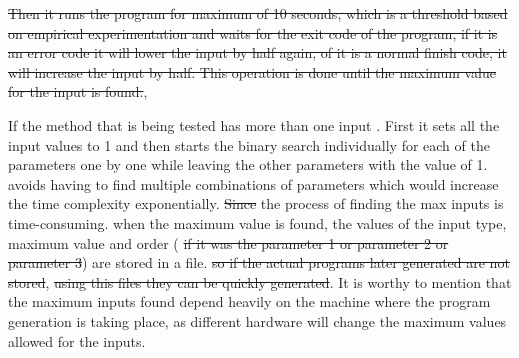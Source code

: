 \st{Then it runs the program for maximum of 10 seconds, which is a threshold based on empirical experimentation and waits for the exit code of the program, if it is an error code it will lower the input by half again, of it is a normal finish code, it will increase the input by half. This operation is done until the maximum value for the input is found.},

If the method that is being tested has more than one input . First it sets all the input values to 1 and then starts the binary search individually for each of the parameters one by one while leaving the other parameters with the value of 1.  avoids having to find multiple combinations of parameters which would increase the time complexity exponentially.  \st{Since} the process of finding the max inputs is time-consuming.  when the maximum value is found, the values of the input type, maximum value and order ( \st{if it was the parameter 1 or parameter 2 or parameter 3}) are stored in a file. \st{so if the actual programs later generated are not stored},  \st{using this files they can be quickly generated}. It is worthy to mention that the maximum inputs found depend heavily on the machine where the program generation is taking place, as different hardware will change the maximum values allowed for the inputs. 

